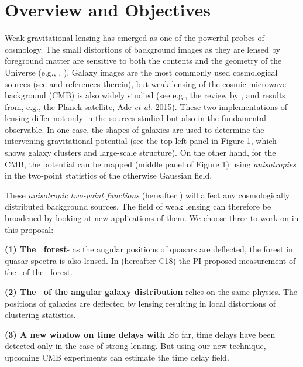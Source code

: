 \section{Overview and Objectives}
Weak gravitational lensing has emerged as one of the powerful probes
of cosmology. The small distortions of background images as
they are lensed by foreground matter are sensitive to both the
contents and the geometry of the Universe (e.g., \cite{blandford92},
\cite{hoekstra2008}).  Galaxy images are the most commonly used
cosmological sources (see \cite{Kilbinger2015} and references
therein), but weak lensing of the cosmic microwave background (CMB) is
also widely studied (see e.g., the review by \cite{lewis2006}, and
results from, e.g., the Planck satellite, Ade {\it et al.} 2015).
 These two implementations of lensing differ not only 
in the sources 
studied  but also in
the fundamental observable. In one case,
 the shapes of galaxies are used to
determine the intervening gravitational potential (see the top
left panel in Figure 1, which shows galaxy clusters and large-scale structure).
On the other hand, for the
CMB, the potential can be mapped (middle panel of Figure 1) using
{\it anisotropies} in the
two-point statistics of the otherwise Gaussian field. 


These {\it anisotropic two-point functions} (hereafter \atf) will 
affect any cosmologically distributed background
sources. The field of weak lensing can therefore be broadened by looking 
at new applications of them. We choose three to work  on in this proposal:

{\bf(1) The \lya\ forest}- as the angular 
positions of quasars are deflected, the forest 
in quasar spectra is also lensed.
In \cite{croft17} (hereafter C18)
 the PI proposed measurement of the 
\atf\ of the \lya\ forest.


 {\bf (2) The \atf\ 
of the angular galaxy distribution}
relies on the same physics. The positions
of galaxies are deflected by lensing
resulting in local distortions of
clustering statistics.

{\bf (3) A new window on time delays with \atf}.So far, time delays have been
detected only in the case of strong lensing. But using our new
technique,  upcoming CMB experiments can estimate the time
delay field.



\vspace{-0.1cm}


